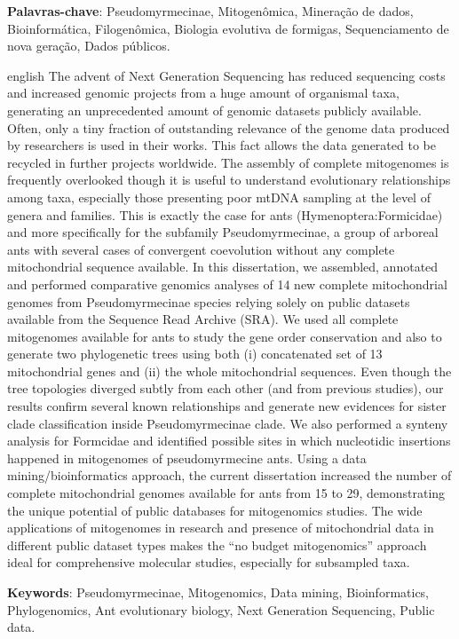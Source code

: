 \documentclass[
	12pt,				%
	oneside,
	a4paper,			%
	english,			%
	spanish,			%
	brazil				%
	]{abntex2}
\begin{document}
\begin{resumo}
 \textbf{Palavras-chave}: Pseudomyrmecinae, Mitogenômica, Mineração de dados, Bioinformática, Filogenômica, Biologia evolutiva de formigas, Sequenciamento de nova geração, Dados públicos.
\end{resumo}

\begin{resumo}[Abstract]
 \begin{otherlanguage*}{english}
   The advent of Next Generation Sequencing has reduced sequencing costs and increased genomic projects from a huge amount of organismal taxa, generating an unprecedented amount of genomic datasets publicly available. Often, only a tiny fraction of outstanding relevance of the genome data produced by researchers is used in their works. This fact allows the data generated to be recycled in further projects worldwide. The assembly of complete mitogenomes is frequently overlooked though it is useful to understand evolutionary relationships among taxa, especially those presenting poor mtDNA sampling at the level of genera and families. This is exactly the case for ants (Hymenoptera:Formicidae) and more specifically for the subfamily Pseudomyrmecinae, a group of arboreal ants with several cases of convergent coevolution without any complete mitochondrial sequence available. In this dissertation, we assembled, annotated and performed comparative genomics analyses of 14 new complete mitochondrial genomes from Pseudomyrmecinae species relying solely on public datasets available from the Sequence Read Archive (SRA). We used all complete mitogenomes available for ants to study the gene order conservation and also to generate two phylogenetic trees using both (i) concatenated set of 13 mitochondrial genes and (ii) the whole mitochondrial sequences. Even though the tree topologies diverged subtly from each other (and from previous studies), our results confirm several known relationships and generate new evidences for sister clade classification inside Pseudomyrmecinae clade. We also performed a synteny analysis for Formcidae and identified possible sites in which nucleotidic insertions happened in mitogenomes of pseudomyrmecine ants. Using a data mining/bioinformatics approach, the current dissertation increased the number of complete mitochondrial genomes available for ants from 15 to 29, demonstrating the unique potential of public databases for mitogenomics studies. The wide applications of mitogenomes in research and presence of mitochondrial data in different public dataset types makes the “no budget mitogenomics” approach ideal for comprehensive molecular studies, especially for subsampled taxa.

   \vspace{\onelineskip}
 
   \noindent 
   \textbf{Keywords}: Pseudomyrmecinae, Mitogenomics, Data mining, Bioinformatics, Phylogenomics, Ant evolutionary biology, Next Generation Sequencing, Public data. 
 \end{otherlanguage*}
\end{resumo}
\end{document}
